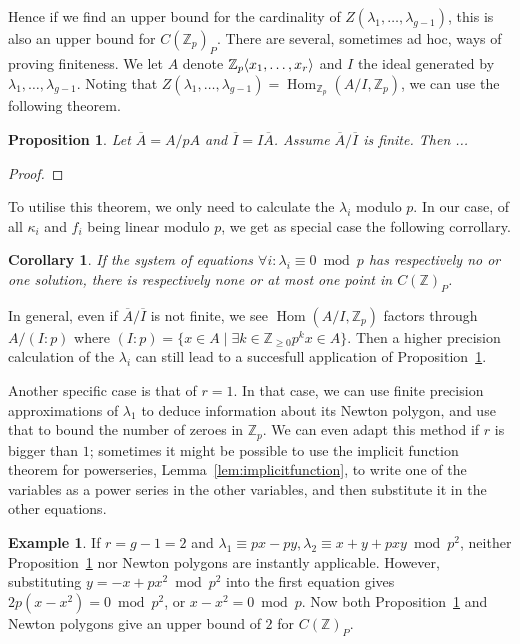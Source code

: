 \documentclass[12pt]{article}
\newcommand{\Z}{\mathbb{Z}}
\renewcommand{\angle}[1]{\hspace{-2pt}\left\langle #1 \right\rangle}
\DeclareMathOperator{\Hom}{Hom}
\theoremstyle{plain}
\newtheorem{cor}[thm]{Corollary} %
\newtheorem{prop}[thm]{Proposition} %
\theoremstyle{definition}
\newtheorem{exmp}[thm]{Example} %
\theoremstyle{remark}
\begin{document}
Hence if we find an upper bound for the cardinality of $Z(\lambda_1,\dots,\lambda_{g-1})$, this is also an upper bound for $C(\Z_p)_P$. There are several, sometimes ad hoc, ways of proving finiteness. We let $A$ denote $\Z_p\angle{x_1,\dots,x_r}$ and $I$ the ideal generated by $\lambda_1,\dots,\lambda_{g-1}$. Noting that $Z(\lambda_1,\dots,\lambda_{g-1}) = \Hom_{\Z_p}(A/I,\Z_p)$, we can use the following theorem.

\begin{prop}
\label{prop:finedix}
Let $\overline{A} = A/pA$ and $\overline{I} = I\overline{A}$. Assume $\overline{A}/\overline{I}$ is finite. Then ...%
\end{prop}
\begin{proof}
\end{proof}

To utilise this theorem, we only need to calculate the $\lambda_i$ modulo $p$. In our case, of all $\kappa_i$ and $f_i$ being linear modulo $p$, we get as special case the following corrollary.
\begin{cor}
\label{cor:finedixlinear}
If the system of equations $\forall i: \lambda_i \equiv 0 \bmod p$ has respectively no or one solution, there is respectively none or at most one point in $C(\Z)_P$.
\end{cor}

In general, even if $\overline{A}/\overline{I}$ is not finite, we see $\Hom(A/I,\Z_p)$ factors through $A/(I:p)$ where $(I:p) = \{x \in A \mid \exists k \in \Z_{\geq 0} p^kx \in A\}$. Then a higher precision calculation of the $\lambda_i$ can still lead to a succesfull application of Proposition~\ref{prop:finedix}.

Another specific case is that of $r = 1$. In that case, we can use finite precision approximations of $\lambda_1$ to deduce information about its Newton polygon, and use that to bound the number of zeroes in $\Z_p$. We can even adapt this method if $r$ is bigger than $1$; sometimes it might be possible to use the implicit function theorem for powerseries, Lemma~\ref{lem:implicitfunction}, to write one of the variables as a power series in the other variables, and then substitute it in the other equations.

\begin{exmp}
If $r = g-1 = 2$ and $\lambda_1 \equiv px-py,\lambda_2 \equiv x+y+pxy \bmod p^2$, neither Proposition~\ref{prop:finedix} nor Newton polygons are instantly applicable. However, substituting $y = -x +px^2 \bmod p^2$ into the first equation gives $2p(x-x^2) = 0 \bmod p^2$, or $x-x^2 = 0\bmod p$. Now both Proposition~\ref{prop:finedix} and Newton polygons give an upper bound of $2$ for $C(\Z)_P$.
\end{exmp}
\end{document}
